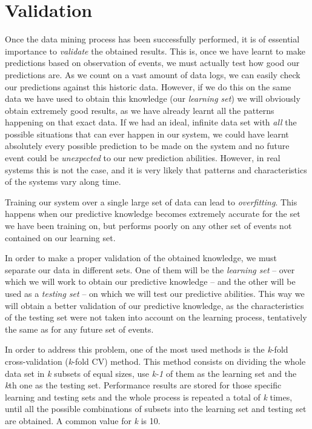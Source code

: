 \documentclass[a4paper,12pt]{article}
\begin{document}
\section{Validation}
Once the data mining process has been successfully performed, it is of essential importance to \emph{validate} the obtained results. This is, once we have learnt to make predictions based on observation of events, we must actually test how good our predictions are. As we count on a vast amount of data logs, we can easily check our predictions against this historic data. However, if we do this on the same data we have used to obtain this knowledge (our \emph{learning set}) we will obviously obtain extremely good results, as we have already learnt all the patterns happening on that exact data. If we had an ideal, infinite data set with \emph{all} the possible situations that can ever happen in our system, we could have learnt absolutely every possible prediction to be made on the system and no future event could be \emph{unexpected} to our new prediction abilities. However, in real systems this is not the case, and it is very likely that patterns and characteristics of the systems vary along time. 

Training our system over a single large set of data can lead to \emph{overfitting}. This happens when our predictive knowledge becomes extremely accurate for the set we have been training on, but performs poorly on any other set of events not contained on our learning set.

In order to make a proper validation of the obtained knowledge, we must separate our data in different sets. One of them will be the \emph{learning set} -- over which we will work to obtain our predictive knowledge -- and the other will be used as a \emph{testing set} -- on which we will test our predictive abilities. This way we will obtain a better validation of our predictive knowledge, as the characteristics of the testing set were not taken into account on the learning process, tentatively the same as for any future set of events.

In order to address this problem, one of the most used methods is the \textit{k}-fold cross-validation (\textit{k}-fold CV) method. This method consists on dividing the whole data set in \textit{k} subsets of equal sizes, use \textit{k-1} of them as the learning set and the \textit{k}th one as the testing set. Performance results are stored for those specific learning and testing sets and the whole process is repeated a total of \textit{k} times, until all the possible combinations of subsets into the learning set and testing set are obtained. A common value for \textit{k} is 10.
\end{document}
